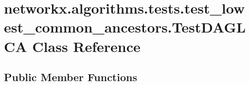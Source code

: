 \hypertarget{classnetworkx_1_1algorithms_1_1tests_1_1test__lowest__common__ancestors_1_1TestDAGLCA}{}\section{networkx.\+algorithms.\+tests.\+test\+\_\+lowest\+\_\+common\+\_\+ancestors.\+Test\+D\+A\+G\+L\+CA Class Reference}
\label{classnetworkx_1_1algorithms_1_1tests_1_1test__lowest__common__ancestors_1_1TestDAGLCA}
\subsection*{Public Member Functions}
